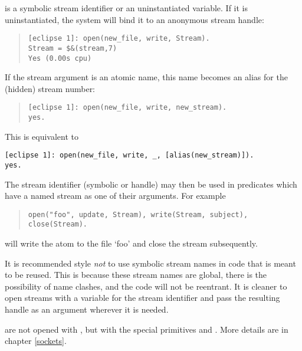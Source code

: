  is a symbolic stream identifier or an uninstantiated variable.
If it is uninstantiated, the system will bind it to an anonymous stream handle:
\begin{quote}
\begin{verbatim}
[eclipse 1]: open(new_file, write, Stream).
Stream = $&(stream,7)
Yes (0.00s cpu)
\end{verbatim}
\end{quote}
If the stream argument is an atomic name, this name becomes an alias
for the (hidden) stream number:
\begin{quote}
\begin{verbatim}
[eclipse 1]: open(new_file, write, new_stream).
yes.
\end{verbatim}
\end{quote}
This is equivalent to
\begin{verbatim}
[eclipse 1]: open(new_file, write, _, [alias(new_stream)]).
yes.
\end{verbatim}
The stream identifier (symbolic or handle) may then be used in predicates
which have a named stream as one of their arguments. For example
\begin{quote}
\begin{verbatim}
open("foo", update, Stream), write(Stream, subject), close(Stream).
\end{verbatim}
\end{quote}
will write the atom
 to the file `foo' and close the stream subsequently.


It is recommended style \emph{not} to use symbolic stream names in code that is
meant to be reused. This is because these stream names are global,
there is the possibility of name clashes, and the code will not be reentrant.
It is cleaner to open streams with a variable for the stream identifier
and pass the resulting handle as an argument wherever it is needed.

 are not opened with , but with the
special primitives
 and
.
More details are in chapter \ref{sockets}.


